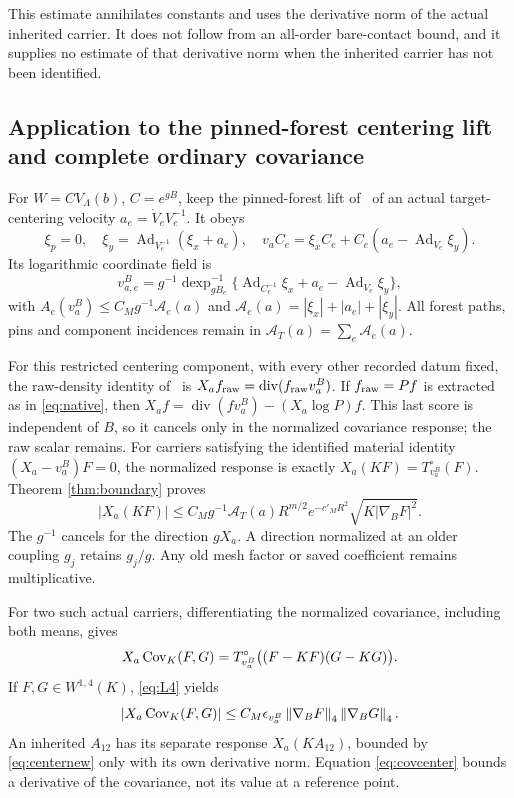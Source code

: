 \documentclass[11pt,letterpaper]{article}
\theoremstyle{remark}\newtheorem{remark}[theorem]{Remark}
\newcommand{\diver}{\operatorname{div}}\newcommand{\Ad}{\operatorname{Ad}}
\newcommand{\norm}[1]{\left\lVert#1\right\rVert}
\begin{document}
This estimate annihilates constants and uses the derivative norm of the actual inherited carrier. It does not follow from an all-order bare-contact bound, and it supplies no estimate of that derivative norm when the inherited carrier has not been identified.

\subsection{Application to the pinned-forest centering lift and complete ordinary covariance}

For $W=CV_\Lambda(b)$, $C=e^{gB}$, keep the pinned-forest lift of~\cite[\S6]{SZ} of an actual target-centering velocity $a_e=\dot V_eV_e^{-1}$. It obeys
\[
 \xi_p=0,\quad
 \xi_y=\Ad_{V_e^{-1}}(\xi_x+a_e),\quad
 v_aC_e=\xi_xC_e+C_e(a_e-\Ad_{V_e}\xi_y).
\]
Its logarithmic coordinate field is
\[
 v_{a,e}^B=g^{-1}\operatorname{dexp}^{-1}_{gB_e}
       \{\Ad_{C_e^{-1}}\xi_x+a_e-\Ad_{V_e}\xi_y\},
\]
with $A_e(v_a^B)\le C_Mg^{-1}\mathcal A_e(a)$ and
$\mathcal A_e(a)=|\xi_x|+|a_e|+|\xi_y|$.
All forest paths, pins and component incidences remain in
$\mathcal A_T(a)=\sum_e\mathcal A_e(a)$.

For this restricted centering component, with every other recorded datum fixed, the raw-density identity of~\cite[\S\S6--7]{SZ} is
$X_af_{\rm raw}=\diver(f_{\rm raw}v_a^B)$.
If $f_{\rm raw}=P f$ is extracted as in \eqref{eq:native}, then
$X_af=\diver(fv_a^B)-(X_a\log P)f$.
This last score is independent of $B$, so it cancels only in the normalized covariance response; the raw scalar remains.
For carriers satisfying the identified material identity
$(X_a-v_a^B)F=0$, the normalized response is exactly
$X_a(KF)=T_{v_a^B}^\circ(F)$. Theorem \ref{thm:boundary} proves
\begin{equation}\label{eq:centernew}
 |X_a(KF)|\le
 C_M g^{-1}\mathcal A_T(a)R^{m/2}e^{-c'_MR^2}
       \sqrt{K|\nabla_BF|^2}.
\end{equation}
The $g^{-1}$ cancels for the direction $gX_a$. A direction normalized at an older coupling $g_j$ retains $g_j/g$. Any old mesh factor or saved coefficient remains multiplicative.

For two such actual carriers, differentiating the normalized covariance, including both means, gives
\[
 X_a\operatorname{Cov}_K(F,G)
 =T_{v_a^B}^\circ\bigl((F-KF)(G-KG)\bigr).
\]
If $F,G\in W^{1,4}(K)$, \eqref{eq:L4} yields
\begin{equation}\label{eq:covcenter}
 |X_a\Cov_K(F,G)|
 \le C_M\epsilon_{v_a^B}
       \norm{\nabla_BF}_4\norm{\nabla_BG}_4.
\end{equation}
An inherited $A_{12}$ has its separate response $X_a(KA_{12})$, bounded by \eqref{eq:centernew} only with its own derivative norm. Equation \eqref{eq:covcenter} bounds a derivative of the covariance, not its value at a reference point.
\end{document}
